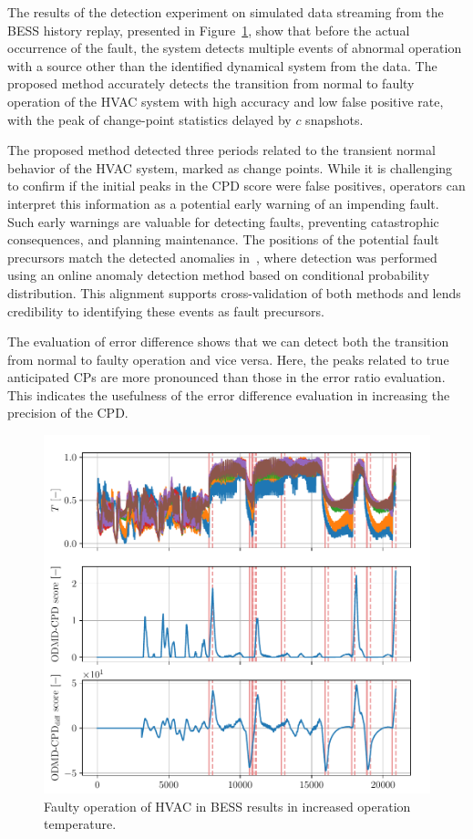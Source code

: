 The results of the detection experiment on simulated data streaming from the BESS history replay, presented in Figure~\ref{fig:bess}, show that before the actual occurrence of the fault, the system detects multiple events of abnormal operation with a source other than the identified dynamical system from the data. The proposed method accurately detects the transition from normal to faulty operation of the HVAC system with high accuracy and low false positive rate, with the peak of change-point statistics delayed by \(c\) snapshots.

The proposed method detected three periods related to the transient normal behavior of the HVAC system, marked as change points. While it is challenging to confirm if the initial peaks in the CPD score were false positives, operators can interpret this information as a potential early warning of an impending fault. Such early warnings are valuable for detecting faults, preventing catastrophic consequences, and planning maintenance. The positions of the potential fault precursors match the detected anomalies in~\citet{Wadinger2024}, where detection was performed using an online anomaly detection method based on conditional probability distribution. This alignment supports cross-validation of both methods and lends credibility to identifying these events as fault precursors.

The evaluation of error difference shows that we can detect both the transition from normal to faulty operation and vice versa. Here, the peaks related to true anticipated CPs are more pronounced than those in the error ratio evaluation. This indicates the usefulness of the error difference evaluation in increasing the precision of the CPD.

\begin{figure}[H]
	\centering
	\includegraphics[width=\linewidth]{figures/bess-chd_p10-l2880_b240_t240roll_2880-dmd_w1.0-hx20.pdf}
	\caption{Faulty operation of HVAC in BESS results in increased operation temperature.}\label{fig:bess}
\end{figure}

